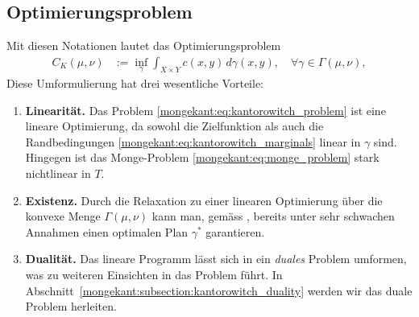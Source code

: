 \subsection{Optimierungsproblem}
Mit diesen Notationen lautet das Optimierungsproblem
\begin{align}
C_K(\mu, \nu)
&:=
\inf_{\gamma}
\int_{X \times Y} c(x,y)\, d\gamma(x,y)
,\quad
\forall \gamma \in \Gamma(\mu, \nu)
,
\label{mongekant:eq:kantorowitch_problem}
\end{align}
Diese Umformulierung hat drei wesentliche Vorteile:
\begin{enumerate}
\item \textbf{Linearität.}
Das Problem \eqref{mongekant:eq:kantorowitch_problem}
ist eine lineare Optimierung,
da sowohl die Zielfunktion
als auch die Randbedingungen \eqref{mongekant:eq:kantorowitch_marginals}
linear in $\gamma$ sind.
Hingegen ist das Monge-Problem \eqref{mongekant:eq:monge_problem}
stark nichtlinear in $T$.
\item \textbf{Existenz.}
Durch die Relaxation zu einer linearen Optimierung
über die konvexe Menge $\Gamma(\mu,\nu)$ kann man,
gemäss \cite{mongekant:ethlecture},
bereits unter sehr schwachen Annahmen
einen optimalen Plan $\gamma^{\ast}$ garantieren.
\item \textbf{Dualität.}
Das lineare Programm lässt sich in ein \emph{duales} Problem umformen,
was zu weiteren Einsichten in das Problem führt.
In Abschnitt~\ref{mongekant:subsection:kantorowitch_duality} werden
wir das duale Problem herleiten.
\end{enumerate}

